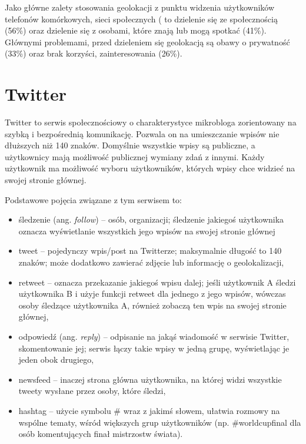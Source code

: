 Jako główne zalety stosowania geolokacji z punktu widzenia użytkowników
telefonów komórkowych, sieci społecznych (\cite{lostInGeolocation}
to dzielenie się ze społecznością (56\%) oraz dzielenie się z osobami, które znają
lub mogą spotkać (41\%). Głównymi problemami, przed dzieleniem się geolokacją
są obawy o prywatność (33\%) oraz brak korzyści, zainteresowania (26\%).



\clearpage\section{Twitter}
Twitter to serwis społecznościowy o charakterystyce mikrobloga zorientowany
na szybką i bezpośrednią komunikację. Pozwala on
na umieszczanie wpisów nie dłuższych niż 140 znaków. Domyślnie wszystkie 
wpisy są publiczne, a użytkownicy mają możliwość publicznej wymiany zdań
z innymi. Każdy użytkownik ma możliwość wyboru użytkowników, których
wpisy chce widzieć na swojej stronie głównej.

Podstawowe pojęcia związane z tym serwisem to:
\begin{itemize}
  \item śledzenie (ang. \textit{follow}) -- osób, organizacji; śledzenie jakiegoś
  użytkownika oznacza wyświetlanie wszystkich jego wpisów na swojej stronie
  głównej 
  \item tweet -- pojedynczy wpis/post na Twitterze; maksymalnie długość to 140
  znaków; może dodatkowo zawierać zdjęcie lub informację o geolokalizacji,
  \item retweet -- oznacza przekazanie jakiegoś wpisu dalej; jeśli użytkownik A
  śledzi użytkownika B i użyje funkcji retweet dla jednego z jego wpisów, 
  wówczas osoby śledzące użytkownika A, również zobaczą ten wpis na
  swojej stronie głównej,
  \item odpowiedź (ang. \textit{reply}) -- odpisanie na jakąś wiadomość w serwisie
  Twitter, skomentowanie jej; serwis łączy takie wpisy w jedną grupę, wyświetlając
  je jeden obok drugiego,
  \item newsfeed -- inaczej strona główna użytkownika, na której widzi wszystkie
  tweety wysłane przez osoby, które śledzi,
  \item hashtag -- użycie symbolu \# wraz z jakimś słowem, ułatwia
  rozmowy na wspólne tematy, wśród większych grup użytkowników 
  (np. \#worldcupfinal dla osób komentujących finał mistrzostw świata).
\end{itemize} 

